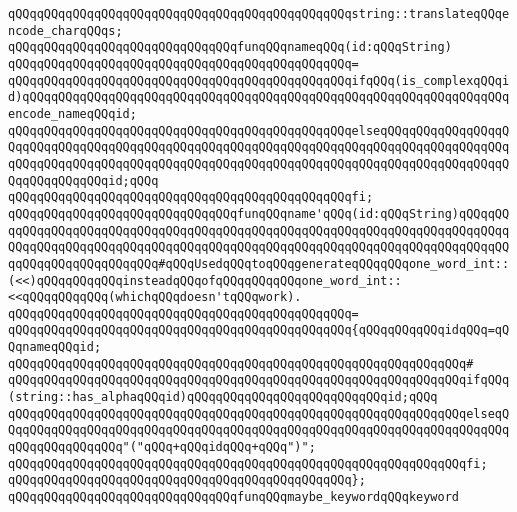 \verb|qQQqqQQqqQQqqQQqqQQqqQQqqQQqqQQqqQQqqQQqqQQqqQQqstring::translateqQQqencode_charqQQqs;|\newline
\newline
\verb|qQQqqQQqqQQqqQQqqQQqqQQqqQQqqQQqfunqQQqnameqQQq(id:qQQqString)|\newline
\verb|qQQqqQQqqQQqqQQqqQQqqQQqqQQqqQQqqQQqqQQqqQQqqQQq=|\newline
\verb|qQQqqQQqqQQqqQQqqQQqqQQqqQQqqQQqqQQqqQQqqQQqqQQqifqQQq(is_complexqQQqid)qQQqqQQqqQQqqQQqqQQqqQQqqQQqqQQqqQQqqQQqqQQqqQQqqQQqqQQqqQQqqQQqqQQqencode_nameqQQqid;|\newline
\verb|qQQqqQQqqQQqqQQqqQQqqQQqqQQqqQQqqQQqqQQqqQQqqQQqelseqQQqqQQqqQQqqQQqqQQqqQQqqQQqqQQqqQQqqQQqqQQqqQQqqQQqqQQqqQQqqQQqqQQqqQQqqQQqqQQqqQQqqQQqqQQqqQQqqQQqqQQqqQQqqQQqqQQqqQQqqQQqqQQqqQQqqQQqqQQqqQQqqQQqqQQqqQQqqQQqqQQqqQQqqQQqid;qQQq|\newline
\verb|qQQqqQQqqQQqqQQqqQQqqQQqqQQqqQQqqQQqqQQqqQQqqQQqfi;|\newline
\newline
\verb|qQQqqQQqqQQqqQQqqQQqqQQqqQQqqQQqfunqQQqname'qQQq(id:qQQqString)qQQqqQQqqQQqqQQqqQQqqQQqqQQqqQQqqQQqqQQqqQQqqQQqqQQqqQQqqQQqqQQqqQQqqQQqqQQqqQQqqQQqqQQqqQQqqQQqqQQqqQQqqQQqqQQqqQQqqQQqqQQqqQQqqQQqqQQqqQQqqQQqqQQqqQQqqQQqqQQqqQQqqQQq#qQQqUsedqQQqtoqQQqgenerateqQQqqQQqone_word_int::(<<)qQQqqQQqqQQqinsteadqQQqofqQQqqQQqqQQqone_word_int::<<qQQqqQQqqQQq(whichqQQqdoesn'tqQQqwork).|\newline
\verb|qQQqqQQqqQQqqQQqqQQqqQQqqQQqqQQqqQQqqQQqqQQqqQQq=|\newline
\verb|qQQqqQQqqQQqqQQqqQQqqQQqqQQqqQQqqQQqqQQqqQQqqQQq{qQQqqQQqqQQqidqQQq=qQQqnameqQQqid;|\newline
\verb|qQQqqQQqqQQqqQQqqQQqqQQqqQQqqQQqqQQqqQQqqQQqqQQqqQQqqQQqqQQqqQQq#|\newline
\verb|qQQqqQQqqQQqqQQqqQQqqQQqqQQqqQQqqQQqqQQqqQQqqQQqqQQqqQQqqQQqqQQqifqQQq(string::has_alphaqQQqid)qQQqqQQqqQQqqQQqqQQqqQQqqQQqid;qQQq|\newline
\verb|qQQqqQQqqQQqqQQqqQQqqQQqqQQqqQQqqQQqqQQqqQQqqQQqqQQqqQQqqQQqqQQqelseqQQqqQQqqQQqqQQqqQQqqQQqqQQqqQQqqQQqqQQqqQQqqQQqqQQqqQQqqQQqqQQqqQQqqQQqqQQqqQQqqQQqqQQq"("qQQq+qQQqidqQQq+qQQq")";|\newline
\verb|qQQqqQQqqQQqqQQqqQQqqQQqqQQqqQQqqQQqqQQqqQQqqQQqqQQqqQQqqQQqqQQqfi;|\newline
\verb|qQQqqQQqqQQqqQQqqQQqqQQqqQQqqQQqqQQqqQQqqQQqqQQq};|\newline
\newline
\verb|qQQqqQQqqQQqqQQqqQQqqQQqqQQqqQQqfunqQQqmaybe_keywordqQQqkeyword|\newline
